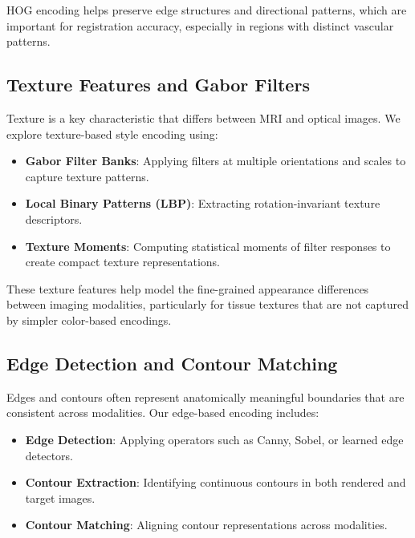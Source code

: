 HOG encoding helps preserve edge structures and directional patterns, which are important for registration accuracy, especially in regions with distinct vascular patterns.

\subsection{Texture Features and Gabor Filters}

Texture is a key characteristic that differs between MRI and optical images. We explore texture-based style encoding using:

\begin{itemize}
    \item \textbf{Gabor Filter Banks}: Applying filters at multiple orientations and scales to capture texture patterns.
    
    \item \textbf{Local Binary Patterns (LBP)}: Extracting rotation-invariant texture descriptors.
    
    \item \textbf{Texture Moments}: Computing statistical moments of filter responses to create compact texture representations.
\end{itemize}

These texture features help model the fine-grained appearance differences between imaging modalities, particularly for tissue textures that are not captured by simpler color-based encodings.

\subsection{Edge Detection and Contour Matching}

Edges and contours often represent anatomically meaningful boundaries that are consistent across modalities. Our edge-based encoding includes:

\begin{itemize}
    \item \textbf{Edge Detection}: Applying operators such as Canny, Sobel, or learned edge detectors.
    
    \item \textbf{Contour Extraction}: Identifying continuous contours in both rendered and target images.
    
    \item \textbf{Contour Matching}: Aligning contour representations across modalities.
\end{itemize}

